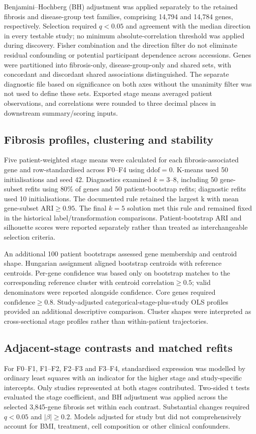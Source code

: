 \documentclass[11pt,a4paper]{article}
\begin{document}
Benjamini–Hochberg (BH) adjustment \cite{ref11} was applied separately to the retained fibrosis and disease-group test families, comprising 14,794 and 14,784 genes, respectively. Selection required \(q<0.05\) and agreement with the median direction in every testable study; no minimum absolute-correlation threshold was applied during discovery. Fisher combination and the direction filter do not eliminate residual confounding or potential participant dependence across accessions. Genes were partitioned into fibrosis-only, disease-group-only and shared sets, with concordant and discordant shared associations distinguished. The separate diagnostic file based on significance on both axes without the unanimity filter was not used to define these sets. Exported stage means averaged patient observations, and correlations were rounded to three decimal places in downstream summary/scoring inputs.

\subsection*{Fibrosis profiles, clustering and stability}
Five patient-weighted stage means were calculated for each fibrosis-associated gene and row-standardised across F0–F4 using \(\mathrm{ddof}=0\). K-means used 50 initialisations and seed 42. Diagnostics examined \(k=3\)–8, including 50 gene-subset refits using 80\% of genes and 50 patient-bootstrap refits; diagnostic refits used 10 initialisations. The documented rule retained the largest k with mean gene-subset \(\mathrm{ARI}\geq 0.95\). The final \(k=5\) solution met this rule and remained fixed in the historical label/transformation comparisons. Patient-bootstrap ARI and silhouette scores were reported separately rather than treated as interchangeable selection criteria.

An additional 100 patient bootstraps assessed gene membership and centroid shape. Hungarian assignment aligned bootstrap centroids with reference centroids. Per-gene confidence was based only on bootstrap matches to the corresponding reference cluster with centroid \(\mathrm{correlation}\geq 0.5\); valid denominators were reported alongside confidence. Core genes required \(\mathrm{confidence}\geq 0.8\). Study-adjusted categorical-stage-plus-study OLS profiles provided an additional descriptive comparison. Cluster shapes were interpreted as cross-sectional stage profiles rather than within-patient trajectories.

\subsection*{Adjacent-stage contrasts and matched refits}
For F0–F1, F1–F2, F2–F3 and F3–F4, standardised expression was modelled by ordinary least squares with an indicator for the higher stage and study-specific intercepts. Only studies represented at both stages contributed. Two-sided t tests evaluated the stage coefficient, and BH adjustment was applied across the selected 3,845-gene fibrosis set within each contrast. Substantial changes required \(q<0.05\) and \(|\beta|\geq0.2\). Models adjusted for study but did not comprehensively account for BMI, treatment, cell composition or other clinical confounders.
\end{document}
